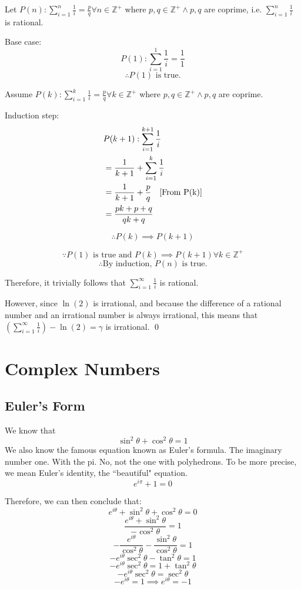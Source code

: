 \documentclass[a4paper]{article}
\theoremstyle{plain}
\theoremstyle{definition}
\theoremstyle{remark}
\newcommand{\sectionSpace}{\vspace{2em}} %
\begin{document}
    
    Let $P(n): \sum\limits_{i=1}^{n} \frac{1}{i} =\frac{p}{q}\forall n\in\mathbb{Z}^+$ where $p,q \in\mathbb{Z}^+\wedge p, q$ are coprime, i.e. $\sum\limits_{i=1}^{n} \frac{1}{i}$ is rational.
    
    Base case:
    $$P(1): \sum\limits_{i=1}^{1} \frac{1}{i}=\frac{1}{1}$$
    $$\therefore P(1) \text{ is true.}$$
    
    Assume $P(k): \sum\limits_{i=1}^{k} \frac{1}{i} =\frac{p}{q}\forall k\in\mathbb{Z}^+$ where $p,q \in\mathbb{Z}^+\wedge p, q$ are coprime.
    
    Induction step:
    \begin{align}
        & P(k+1):\sum\limits_{i=1}^{k+1} \frac{1}{i} \\
        & =\frac{1}{k+1}+\sum\limits_{i=1}^{k} \frac{1}{i} \\
        & =\frac{1}{k+1}+\frac{p}{q}\text{\quad [From P(k)]} \\
        & =\frac{pk+p+q}{qk+q}
    \end{align}
    
    $$\therefore P(k)\implies P(k+1)$$
    
    $$\because P(1)\text{ is true and }P(k)\implies P(k+1)\forall k\in\mathbb{Z}^+$$
    $$\therefore\text{By induction, }P(n)\text{ is true.}$$
    
Therefore, it trivially follows that $\sum\limits_{i=1}^{\infty} \frac{1}{i}$ is rational.

However, since $\ln(2)$ is irrational, and because the difference of a rational number and an irrational number is always irrational, this means that $\left(\sum\limits_{i=1}^{\infty} \frac{1}{i}\right)-\ln(2)=\gamma$ is irrational.
\qed


\sectionSpace
\section{Complex Numbers}
    \subsection{Euler's Form}
    We know that
    $$\sin^2\theta + \cos^2\theta = 1$$
    We also know the famous equation known as Euler's formula. The imaginary number one. With the pi. No, not the one with polyhedrons. To be more precise, we mean Euler's identity, the ``beautiful" equation.
    $$e^{i\pi} + 1 = 0$$

    Therefore, we can then conclude that:
    $$e^{i\theta} + \sin^2\theta + \cos^2\theta = 0$$
    $$\frac{e^{i\theta} + \sin^2\theta}{-\cos^2\theta} = 1$$
    $$-\frac{e^{i\theta}}{\cos^2\theta} -\frac{\sin^2\theta}{\cos^2\theta} = 1$$
    $$-e^{i\theta}\sec^2\theta -\tan^2\theta = 1$$
    $$-e^{i\theta}\sec^2\theta = 1 + \tan^2\theta$$
    $$-e^{i\theta}\sec^2\theta = \sec^2\theta$$
    $$-e^{i\theta} = 1 \implies e^{i\theta} = -1$$
\end{document}

